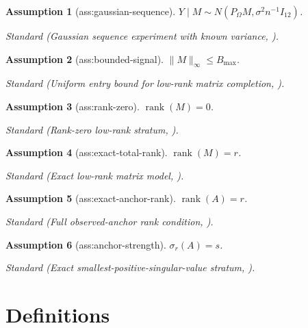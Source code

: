 \documentclass{article}
\newtheorem{assumption}{Assumption}
\begin{document}
\begin{assumption}[ass:gaussian-sequence]\label{ass:gaussian-sequence}
\(Y\mid M\sim N(P_{\Omega}M,\sigma^2 n^{-1}I_{12})\).
\par\smallskip\noindent\emph{Standard} (Gaussian sequence experiment with known variance, \cite{CaiLow2004AdaptiveCI}).
\end{assumption}

\begin{assumption}[ass:bounded-signal]\label{ass:bounded-signal}
\(\lVert M\rVert_{\infty}\le B_{\max}\).
\par\smallskip\noindent\emph{Standard} (Uniform entry bound for low-rank matrix completion, \cite{CarpentierKloppLofflerNickl2018}).
\end{assumption}

\begin{assumption}[ass:rank-zero]\label{ass:rank-zero}
\(\operatorname{rank}(M)=0\).
\par\smallskip\noindent\emph{Standard} (Rank-zero low-rank stratum, \cite{CarpentierKloppLofflerNickl2018}).
\end{assumption}

\begin{assumption}[ass:exact-total-rank]\label{ass:exact-total-rank}
\(\operatorname{rank}(M)=r\).
\par\smallskip\noindent\emph{Standard} (Exact low-rank matrix model, \cite{AtheyBayatiDoudchenkoImbensKhosravi2021}).
\end{assumption}

\begin{assumption}[ass:exact-anchor-rank]\label{ass:exact-anchor-rank}
\(\operatorname{rank}(A)=r\).
\par\smallskip\noindent\emph{Standard} (Full observed-anchor rank condition, \cite{YanWainwright2024MissingPanel}).
\end{assumption}

\begin{assumption}[ass:anchor-strength]\label{ass:anchor-strength}
\(\sigma_r(A)=s\).
\par\smallskip\noindent\emph{Standard} (Exact smallest-positive-singular-value stratum, \cite{Onatski2012WeakFactors}).
\end{assumption}

\section{Definitions}
\end{document}

